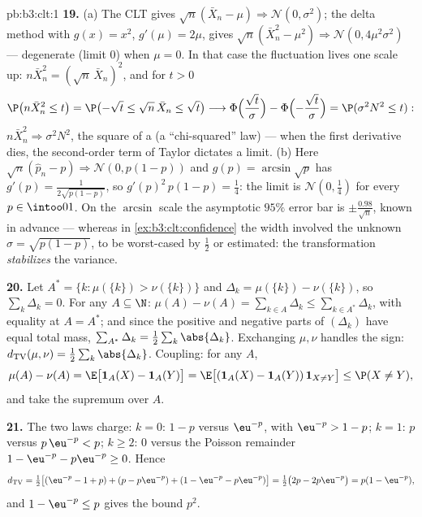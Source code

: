 \begin{solution}{pb:b3:clt:1}
\textbf{19.} (a) The CLT gives $\sqrt n(\bar X_n - \mu)
\Rightarrow \mathcal N(0, \sigma^2)$; the delta method
with $g(x) = x^2$, $g'(\mu) = 2\mu$, gives $\sqrt n(\bar
X_n^2 - \mu^2) \Rightarrow \mathcal N(0, 4\mu^2\sigma^2)$
--- degenerate (limit $0$) when $\mu = 0$. In that case
the fluctuation lives one scale up: $n\bar X_n^2 =
(\sqrt n\,\bar X_n)^2$, and for $t > 0$
\[
\P\bigl(n\bar X_n^2 \leq t\bigr) = \P\bigl(-\sqrt t \leq
\sqrt n\,\bar X_n \leq \sqrt t\bigr) \longrightarrow
\Phi\Bigl(\frac{\sqrt t}\sigma\Bigr) -
\Phi\Bigl(-\frac{\sqrt t}\sigma\Bigr) = \P(\sigma^2N^2
\leq t) :
\]
$n\bar X_n^2 \Rightarrow \sigma^2N^2$, the square of a
 (a ``chi-squared'' law) --- when the first
derivative dies, the second-order term of Taylor dictates
a  limit. (b) Here $\sqrt n(\hat p_n - p)
\Rightarrow \mathcal N(0, p(1 - p))$ and $g(p) =
\arcsin\sqrt p$ has $g'(p) = \frac1{2\sqrt{p(1 - p)}}$, so
$g'(p)^2\,p(1 - p) = \frac14$: the limit is $\mathcal
N(0, \frac14)$ for every $p \in \intoo01$. On the
$\arcsin$ scale the asymptotic $95\%$ error bar is $\pm
\frac{0.98}{\sqrt n}$, known in advance --- whereas in
\cref{ex:b3:clt:confidence} the width involved the unknown
$\sigma = \sqrt{p(1-p)}$, to be worst-cased by $\frac12$
or estimated: the transformation \emph{stabilizes} the
variance.

\textbf{20.} Let $A^* = \{k : \mu(\{k\}) > \nu(\{k\})\}$
and $\Delta_k = \mu(\{k\}) - \nu(\{k\})$, so
$\sum_k\Delta_k = 0$. For any $A \subseteq \N$: $\mu(A) -
\nu(A) = \sum_{k\in A}\Delta_k \leq \sum_{k\in
A^*}\Delta_k$, with equality at $A = A^*$; and since the
positive and negative parts of $(\Delta_k)$ have equal
total mass, $\sum_{A^*}\Delta_k =
\frac12\sum_k\abs{\Delta_k}$. Exchanging $\mu, \nu$ handles
the sign: $d_{\mathrm{TV}}(\mu, \nu) =
\frac12\sum_k\abs{\Delta_k}$. Coupling: for any $A$,
\[
\mu(A) - \nu(A) = \E\bigl[\mathbf 1_A(X) - \mathbf
1_A(Y)\bigr] = \E\bigl[(\mathbf 1_A(X) - \mathbf
1_A(Y))\,\mathbf 1_{X\neq Y}\bigr] \leq \P(X \neq Y),
\]
and take the supremum over $A$.

\textbf{21.} The two laws charge: $k = 0$: $1 - p$ versus
$\eu^{-p}$, with $\eu^{-p} > 1 - p$; $k = 1$: $p$ versus
$p\,\eu^{-p} < p$; $k \geq 2$: $0$ versus the Poisson
remainder $1 - \eu^{-p} - p\eu^{-p} \geq 0$. Hence
\[
d_{\mathrm{TV}} = \tfrac12\bigl[(\eu^{-p} - 1 + p) + (p -
p\eu^{-p}) + (1 - \eu^{-p} - p\eu^{-p})\bigr] =
\tfrac12\bigl(2p - 2p\eu^{-p}\bigr) = p(1 - \eu^{-p}),
\]
and $1 - \eu^{-p} \leq p$ gives the bound $p^2$.


\end{solution}
